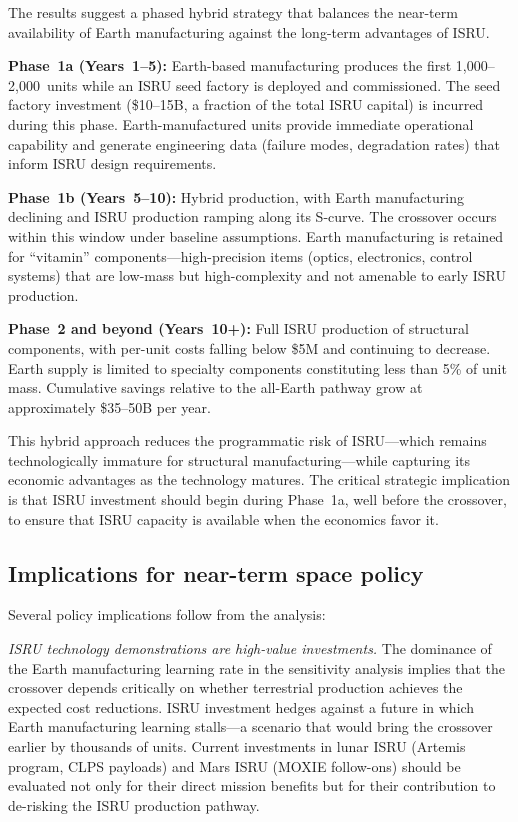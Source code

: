 \documentclass[preprint,12pt]{elsarticle}
\begin{document}
The results suggest a phased hybrid strategy that balances the near-term availability of Earth manufacturing against the long-term advantages of ISRU.

\textbf{Phase~1a (Years~1--5):} Earth-based manufacturing produces the first 1{,}000--2{,}000~units while an ISRU seed factory is deployed and commissioned. The seed factory investment (\$10--15B, a fraction of the total ISRU capital) is incurred during this phase. Earth-manufactured units provide immediate operational capability and generate engineering data (failure modes, degradation rates) that inform ISRU design requirements.

\textbf{Phase~1b (Years~5--10):} Hybrid production, with Earth manufacturing declining and ISRU production ramping along its S-curve. The crossover occurs within this window under baseline assumptions. Earth manufacturing is retained for ``vitamin'' components---high-precision items (optics, electronics, control systems) that are low-mass but high-complexity and not amenable to early ISRU production.

\textbf{Phase~2 and beyond (Years~10+):} Full ISRU production of structural components, with per-unit costs falling below \$5M and continuing to decrease. Earth supply is limited to specialty components constituting less than 5\% of unit mass. Cumulative savings relative to the all-Earth pathway grow at approximately \$35--50B per year.

This hybrid approach reduces the programmatic risk of ISRU---which remains technologically immature for structural manufacturing---while capturing its economic advantages as the technology matures. The critical strategic implication is that ISRU investment should begin during Phase~1a, well before the crossover, to ensure that ISRU capacity is available when the economics favor it.

\subsection{Implications for near-term space policy}

Several policy implications follow from the analysis:

\emph{ISRU technology demonstrations are high-value investments.} The dominance of the Earth manufacturing learning rate in the sensitivity analysis implies that the crossover depends critically on whether terrestrial production achieves the expected cost reductions. ISRU investment hedges against a future in which Earth manufacturing learning stalls---a scenario that would bring the crossover earlier by thousands of units. Current investments in lunar ISRU (Artemis program, CLPS payloads) and Mars ISRU (MOXIE follow-ons) should be evaluated not only for their direct mission benefits but for their contribution to de-risking the ISRU production pathway.
\end{document}
